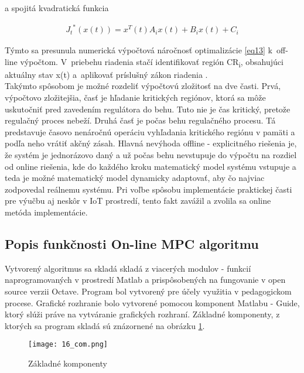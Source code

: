 a spojitá kvadratická funkcia

\begin{equation} \label{eq37}
\begin{split}
{J_{t}}^{*}\left( x\left( t \right) \right) = x^{T}\left( t \right)A_{i}x\left( t \right) + B_{i}x\left( t \right) + C_{i}
\end{split}
\end{equation}

Týmto sa presunula numerická výpočtová náročnosť optimalizácie \ref{eq13} k~off-line výpočtom. V~priebehu riadenia stačí identifikovať región CR\textsubscript{i}, obsahujúci aktuálny stav x(t) a~aplikovať príslušný
zákon riadenia \label{eq36}. \cite{MPC05} \\
Takýmto spôsobom je možné rozdeliť výpočtovú zložitosť na dve časti. Prvá, výpočtovo zložitejšia, časť je hľadanie kritických regiónov, ktorá sa môže uskutočniť pred zavedením regulátora do behu. Tuto nie je čas kritický, pretože regulačný proces nebeží. Druhá časť je počas behu regulačného procesu. Tá predstavuje časovo nenáročnú operáciu vyhľadania kritického regiónu v pamäti a podľa neho vrátiť akčný zásah. Hlavná nevýhoda offline - explicitného riešenia je, že systém je jednorázovo daný a už počas behu nevstupuje do výpočtu na rozdiel od online riešenia, kde do každého kroku matematický model systému vstupuje a teda je možné  matematický model dynamicky adaptovať, aby čo najviac zodpovedal reálnemu systému. Pri voľbe spôsobu implementácie praktickej časti pre výučbu aj neskôr v IoT prostredí, tento fakt zavážil a zvolila sa online metóda implementácie.
\subsection{Popis funkčnosti On-line MPC algoritmu} \label{mpcalg}
Vytvorený algoritmus sa skladá skladá z viacerých modulov - funkcií naprogramovaných v prostredí Matlab a prispôsobených na fungovanie v open source verzii Octave. Program bol vytvorený pre účely využitia v pedagogickom procese. Grafické rozhranie bolo vytvorené pomocou komponent Matlabu - Guide, ktorý slúži práve na vytváranie grafických rozhraní. Základné komponenty, z ktorých sa program skladá sú znázornené na obrázku \ref{16_com}.
\begin{figure}[!htbp]
\centering
\texttt{[image: 16\_com.png]}
\caption{Základné komponenty}
\label{16_com}
\end{figure}

